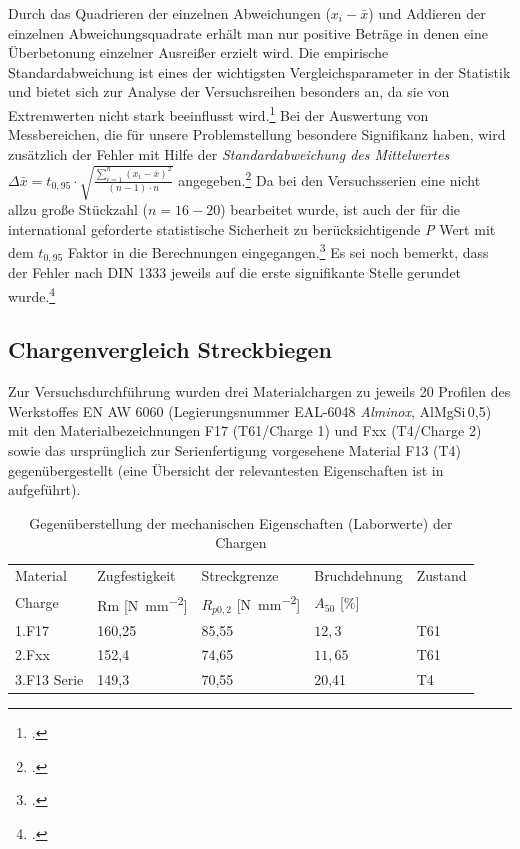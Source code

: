 \documentclass[12pt,a4paper,parskip]{scrartcl}
\begin{document}
{Durch das Quadrieren der einzelnen Abweichungen ($ x_i-\bar{x}$) und Addieren der einzelnen Abweichungsquadrate erhält man nur positive Beträge in denen eine Überbetonung einzelner Ausreißer erzielt wird.
Die empirische Standardabweichung ist   eines der wichtigsten Vergleichsparameter in der Statistik und bietet sich zur Analyse der Versuchsreihen besonders an, da sie von Extremwerten nicht stark beeinflusst wird.\footcite[Vgl.][54]{gst} Bei der Auswertung von Messbereichen, die für unsere Problemstellung besondere Signifikanz haben, wird zusätzlich der Fehler mit Hilfe der  \emph{Standardabweichung des Mittelwertes}  $ \Delta\bar{x}= t_{0,95} \cdot \sqrt{\frac{\sum \limits_{i=1}^n (x_i - \bar{x})^2}{(n-1)\cdot n}}$ angegeben.\footcite[Vgl.][16]{ph} Da bei den Versuchsserien eine nicht allzu große Stückzahl ($ n=16-20 $) bearbeitet wurde,  ist auch der für die international geforderte statistische Sicherheit zu berücksichtigende \emph{P} Wert mit dem $ t_{0,95} $ Faktor in die Berechnungen eingegangen.\footcite[Vgl.][609]{tp}  Es sei noch bemerkt, dass der Fehler nach DIN 1333 jeweils auf die erste signifikante Stelle gerundet wurde.\footcite[Vgl.][612]{tp}
 	 	
 	

 	
 	 	


\subsection{Chargenvergleich Streckbiegen}
Zur Versuchsdurchführung wurden drei Materialchargen zu jeweils 20 Profilen des Werkstoffes EN AW 6060 (Legierungsnummer EAL-6048 \emph{Alminox}, AlMgSi\,0,5) mit den Materialbezeichnungen F17 (T61/Charge 1) und Fxx (T4/Charge 2) sowie das ursprünglich zur Serienfertigung vorgesehene Material F13 (T4)  gegenübergestellt (eine Übersicht der relevantesten Eigenschaften ist in  aufgeführt).
\begin{table}[htbp]
\caption{Gegenüberstellung der mechanischen Eigenschaften (Laborwerte) der Chargen}
\label{tab:chargeneigenschaften}
\centering
\begin{tabular}{lllll}
\toprule
Material & Zugfestigkeit & Streckgrenze & Bruchdehnung & Zustand \\
Charge &  Rm [\si{\newton\per\milli\meter\squared}] &  $R_{p0,2}$ [\si{\newton\per\milli\meter\squared}] &  $A_{50}$ [\%] & \\
\midrule
1.F17 & 160,25 & 85,55 & $ 12,3 $ & T61 \\
2.Fxx & 152,4 & 74,65 &  $ 11,65 $ & T61 \\
3.F13 Serie & 149,3 & 70,55 & 20,41  & T4 \\
\bottomrule





\end{tabular}
\end{table}}
\end{document}

